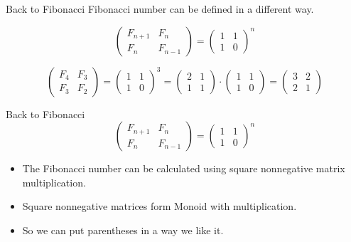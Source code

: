 \documentclass[presentation,aspectratio=169,smaller]{beamer}
\begin{document}
\begin{frame}[label={sec:orgcbed477}]{Back to Fibonacci}
Fibonacci number can be defined in a different way.

\begin{equation*}
  \begin{pmatrix}
    F_{n+1} & F_n \\
    F_n & F_{n-1}
  \end{pmatrix} =
  \begin{pmatrix}
    1 & 1 \\
    1 & 0
  \end{pmatrix} ^ n
\end{equation*}

\pause

\begin{equation*}
  \begin{pmatrix}
    F_4 & F_3 \\
    F_3 & F_2
  \end{pmatrix} =
  \begin{pmatrix}
    1 & 1 \\
    1 & 0
  \end{pmatrix} ^ 3 =
  \begin{pmatrix}
    2 & 1 \\
    1 & 1
  \end{pmatrix} \cdot
  \begin{pmatrix}
    1 & 1 \\
    1 & 0
  \end{pmatrix} =
  \begin{pmatrix}
    3 & 2 \\
    2 & 1
  \end{pmatrix}
\end{equation*}
\end{frame}

\begin{frame}[label={sec:orgc7b4ba9}]{Back to Fibonacci}
\begin{equation*}
  \begin{pmatrix}
    F_{n+1} & F_n \\
    F_n & F_{n-1}
  \end{pmatrix} =
  \begin{pmatrix}
    1 & 1 \\
    1 & 0
  \end{pmatrix} ^ n
\end{equation*}

\pause

\begin{itemize}
\item The Fibonacci number can be calculated using square nonnegative matrix
multiplication.
\item Square nonnegative matrices form Monoid with multiplication.
\item So we can put parentheses in a way we like it.
\end{itemize}
\end{frame}
\end{document}
